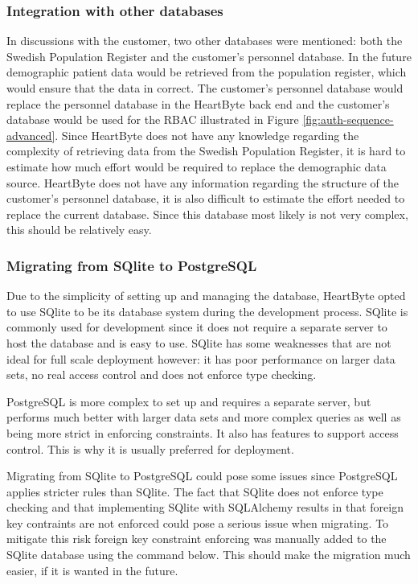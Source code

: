 \documentclass{article}
\begin{document}
\subsubsection{Integration with other databases}
In discussions with the customer, two other databases were mentioned: both the Swedish Population Register and the customer's personnel database. In the future demographic patient data would be retrieved from the population register, which would ensure that the data in correct. The customer's personnel database would replace the personnel database in the HeartByte back end and the customer's database would be used for the RBAC illustrated in Figure \ref{fig:auth-sequence-advanced}.
Since HeartByte does not have any knowledge regarding the complexity of retrieving data from the Swedish Population Register, it is hard to estimate how much effort would be required to replace the demographic data source. HeartByte does not have any information regarding the structure of the customer's personnel database, it is also difficult to estimate the effort needed to replace the current database. Since this database most likely is not very complex, this should be relatively easy.


\subsubsection{Migrating from SQlite to PostgreSQL}
Due to the simplicity of setting up and managing the database, HeartByte opted to use SQlite to be its database system during the development process. SQlite is commonly used for development since it does not require a separate server to host the database and is easy to use. SQlite has some weaknesses that are not ideal for full scale deployment however: it has poor performance on larger data sets, no real access control and does not enforce type checking. 

PostgreSQL is more complex to set up and requires a separate server, but performs much better with larger data sets and more complex queries as well as being more strict in enforcing constraints. It also has features to support access control. This is why it is usually preferred for deployment. 

Migrating from SQlite to PostgreSQL could pose some issues since PostgreSQL applies stricter rules than SQlite. The fact that SQlite does not enforce type checking and that implementing SQlite with SQLAlchemy results in that foreign key contraints are not enforced could pose a serious issue when migrating. To mitigate this risk foreign key constraint enforcing was manually added to the SQlite database using the command below. This should make the migration much easier, if it is wanted in the future.
\end{document}
